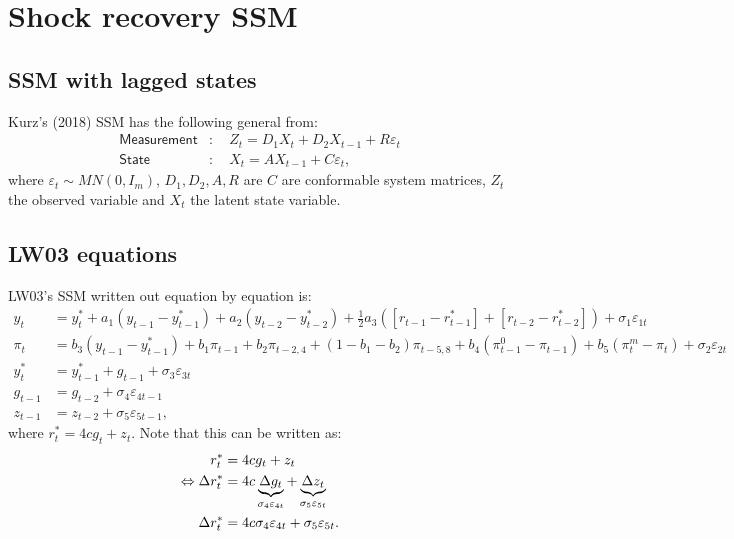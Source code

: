 \documentclass[a4paper,12pt]{article}
\newcommand{\bsq}{\begin{subequations}}\newcommand{\esq}{\end{subequations}}
\begin{document}
\section{Shock recovery SSM}

\subsection{SSM with lagged states }

Kurz's (2018) SSM has the following general from:\bsq\label{SSM}%
\begin{align}
\mathsf{Measurement}& :\quad Z_{t}=D_{1}X_{t}+D_{2}X_{t-1}+R\varepsilon _{t}
\label{ssm1} \\
\mathsf{State}& :\quad X_{t}=AX_{t-1}+C\varepsilon _{t},  \label{ssm2}
\end{align}%
\esq where $\varepsilon _{t}\sim MN(0,I_{m})$, $D_{1},D_{2},A,R$ are $C$ are
conformable system matrices, $Z_{t}$ the observed variable and $X_{t}$ the
latent state variable.

\subsection{LW03 equations}

LW03's SSM written out equation by equation is:\pagebreak {} \bsq\label%
{LW03}%
\begin{align}
y_{t}& =y_{t}^{\ast }+a_{1}\left( y_{t-1}-y_{t-1}^{\ast }\right)
+a_{2}\left( y_{t-2}-y_{t-2}^{\ast }\right) +\tfrac{1}{2}a_{3}\left( \left[
r_{t-1}-r_{t-1}^{\ast }\right] +\left[ r_{t-2}-r_{t-2}^{\ast }\right]
\right) +\sigma _{1}\varepsilon _{1t}  \label{LW03a} \\
\pi _{t}& =b_{3}\left( y_{t-1}-y_{t-1}^{\ast }\right) +b_{1}\pi
_{t-1}+b_{2}\pi _{t-2,4}+\left( 1-b_{1}-b_{2}\right) \pi _{t-5,8}+b_{4}(\pi
_{t-1}^{0}-\pi _{t-1})+b_{5}\left( \pi _{t}^{m}-\pi _{t}\right) +\sigma
_{2}\varepsilon _{2t}  \label{LW03b} \\
y_{t}^{\ast }& =y_{t-1}^{\ast }+g_{t-1}+\sigma _{3}\varepsilon _{3t}
\label{LW03c} \\
g_{t-1}& =g_{t-2}+\sigma _{4}\varepsilon _{4t-1}  \label{LW03d} \\
z_{t-1}& =z_{t-2}+\sigma _{5}\varepsilon _{5t-1},  \label{LW03e}
\end{align}%
\esq\EAW where $r_{t}^{\ast }=4cg_{t}+z_{t}$. Note that this can be written
as:%
\begin{align}
r_{t}^{\ast }& =4cg_{t}+z_{t}  \notag \\
\Leftrightarrow \Delta r_{t}^{\ast }& =4c\underbrace{\Delta g_{t}}_{\sigma
_{4}\varepsilon _{4t}}+\underbrace{\Delta z_{t}}_{\sigma _{5}\varepsilon
_{5t}}  \notag \\
\Delta r_{t}^{\ast }& =4c\sigma _{4}\varepsilon _{4t}+\sigma _{5}\varepsilon
_{5t}.  \label{Drstar}
\end{align}
\end{document}
